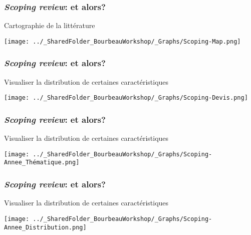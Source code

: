 \documentclass{beamer}
\begin{document}

    \begin{frame}
    
      \frametitle{\emph{Scoping review}: et \R alors?} \vspace{1cm}
      
      Cartographie de la littérature
      
        \begin{center}
         \texttt{[image: ../\_SharedFolder\_BourbeauWorkshop/\_Graphs/Scoping-Map.png]}
        \end{center} 
      
          
    \end{frame}  
    

    \begin{frame}
    
      \frametitle{\emph{Scoping review}: et \R alors?} \vspace{1cm}
      
      Visualiser la distribution de certaines caractéristiques
      
        \begin{center}
         \texttt{[image: ../\_SharedFolder\_BourbeauWorkshop/\_Graphs/Scoping-Devis.png]}
        \end{center} 
      
          
    \end{frame}  
    

    \begin{frame}
    
      \frametitle{\emph{Scoping review}: et \R alors?} \vspace{1cm}
      
      Visualiser la distribution de certaines caractéristiques
      
        \begin{center}
         \texttt{[image: ../\_SharedFolder\_BourbeauWorkshop/\_Graphs/Scoping-Annee\_Thématique.png]}
        \end{center} 
      
          
    \end{frame}  
    

    \begin{frame}
    
      \frametitle{\emph{Scoping review}: et \R alors?} \vspace{1cm}
      
      Visualiser la distribution de certaines caractéristiques
      
     \begin{center}
         \texttt{[image: ../\_SharedFolder\_BourbeauWorkshop/\_Graphs/Scoping-Annee\_Distribution.png]}
        \end{center} 
      
          
    \end{frame}  
    
\end{document}

